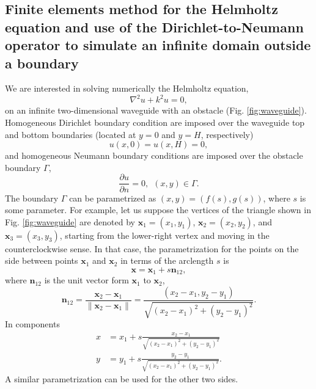 \documentclass[11pt]{article}
\begin{document}
\subsection{Finite elements method for the Helmholtz equation and use of the Dirichlet-to-Neumann operator to simulate an infinite domain outside a boundary}
We are interested in solving numerically the Helmholtz equation,
\begin{equation}
  \label{eq:9}
  \nabla^2 u + k^2u = 0,
\end{equation}
on an infinite two-dimensional waveguide with an obstacle (Fig. \ref{fig:waveguide}). Homogeneous Dirichlet boundary condition are imposed over the waveguide top and bottom boundaries (located at $y=0$ and $y=H$, respectively)
\begin{equation}
  \label{eq:10}
  u(x,0) = u(x,H) = 0,
\end{equation}
and homogeneous Neumann boundary conditions are imposed over the obstacle boundary $\Gamma$,
\begin{equation}
  \label{eq:11}
  \frac{\partial u}{\partial n} = 0,~~(x,y) \in \Gamma.
\end{equation}
The boundary $\Gamma$ can be parametrized as $(x,y) = (f(s), g(s))$, where $s$ is some parameter. For example, let us suppose the vertices of the triangle shown in Fig. \ref{fig:waveguide} are denoted by $\mathbf{x}_1 = (x_1, y_1)$, $\mathbf{x}_2 = (x_2, y_2)$, and $\mathbf{x}_3 = (x_3,y_3)$, starting from the lower-right vertex and moving in the counterclockwise sense. In that case, the parametrization for the points on the side between points $\mathbf{x}_1$ and $\mathbf{x}_2$ in terms of the arclength $s$ is
\begin{equation}
  \label{eq:15}
  \mathbf{x} = \mathbf{x}_1 + s\mathbf{n}_{12},
\end{equation}
where $\mathbf{n}_{12}$ is the unit vector form $\mathbf{x}_1$ to $\mathbf{x}_2$,
\begin{equation}
  \label{eq:26}
  \mathbf{n}_{12} = \frac{\mathbf{x}_2 - \mathbf{x}_1}{\|\mathbf{x}_2 - \mathbf{x}_1\|} =
  \frac{(x_2 - x_1, y_2 - y_1)}{\sqrt{(x_2 - x_1)^2 + (y_2 - y_1)^2}}.
\end{equation}
In components
\begin{align}
  x &= x_1 + s \frac{x_2 - x_1}{\sqrt{(x_2 - x_1)^2 + (y_2 - y_1)^2}} \\
  y &= y_1 + s \frac{y_2 - y_1}{\sqrt{(x_2 - x_1)^2 + (y_2 - y_1)^2}}.
\end{align}
A similar parametrization can be used for the other two sides.
\end{document}
